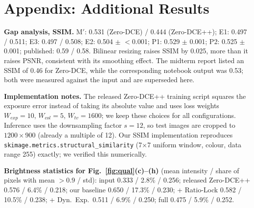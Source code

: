\documentclass[11pt, letterpaper]{article}
\begin{document}
\appendix

\section{Appendix: Additional Results}

\textbf{Gap analysis, SSIM.} M$'$: 0.531 (Zero-DCE) / 0.444 (Zero-DCE++);
E1: 0.497 / 0.511; E3: 0.497 / 0.508; E2: 0.504 $\pm$ $<$0.001; P1: 0.529 $\pm$ 0.001;
P2: 0.525 $\pm$ 0.001; published: 0.59 / 0.58. Bilinear resizing raises SSIM by
0.025, more than it raises PSNR, consistent with its smoothing effect. The midterm
report listed an SSIM of 0.46 for Zero-DCE, while the corresponding notebook output
was 0.53; both were measured against the input and are superseded here.

\textbf{Implementation notes.} The released Zero-DCE++ training script squares the
exposure error instead of taking its absolute value and uses loss weights
$W_{exp}=10$, $W_{col}=5$, $W_{tv}=1600$; we keep these choices for all
configurations. Inference uses the downsampling factor $s=12$, so test images are
cropped to $1200\times900$ (already a multiple of 12). Our SSIM implementation
reproduces \texttt{skimage.metrics.structural\_similarity} (7$\times$7 uniform
window, colour, data range 255) exactly; we verified this numerically.

\textbf{Brightness statistics for Fig.~\ref{fig:qual}(c)--(h)} (mean intensity /
share of pixels with mean $>0.9$ / std): input 0.333 / 2.8\% / 0.256; released
Zero-DCE++ 0.576 / 6.4\% / 0.218; our baseline 0.650 / 17.3\% / 0.230; + Ratio-Lock
0.582 / 10.5\% / 0.238; + Dyn.\ Exp.\ 0.511 / 6.9\% / 0.250; full 0.475 / 5.9\% / 0.252.
\end{document}
